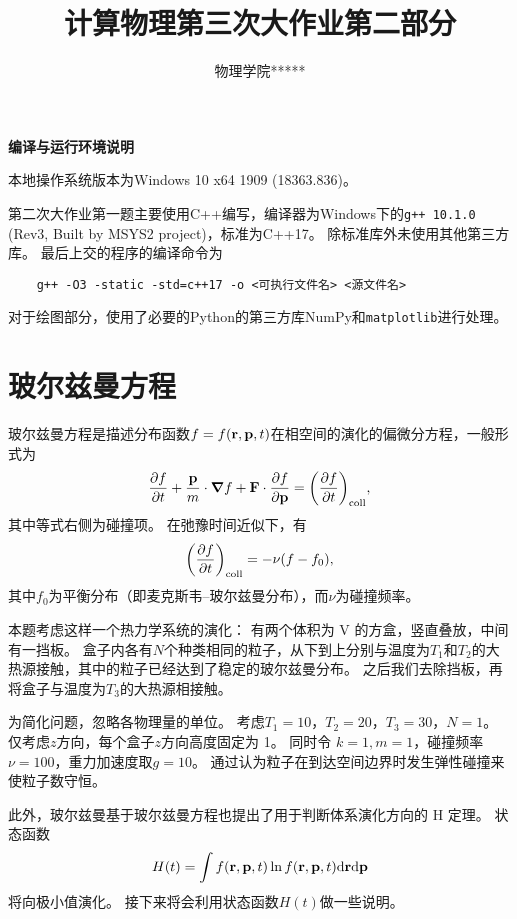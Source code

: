 \documentclass[a4paper,unicode]{report}
\title{计算物理第三次大作业第二部分}
\author{物理学院\quad ***\quad 1800011***}
\begin{document}
\maketitle
\tableofcontents

\begin{center}
    \textbf{编译与运行环境说明}
\end{center}

本地操作系统版本为\textsf{Windows 10 x64 1909 (18363.836)}。

第二次大作业第一题主要使用\textsf{C++}编写，编译器为Windows下的\texttt{g++ 10.1.0} (Rev3, Built by MSYS2 project)，标准为\textsf{C++17}。
除标准库外未使用其他第三方库。
最后上交的程序的编译命令为\begin{verbatim}
    g++ -O3 -static -std=c++17 -o <可执行文件名> <源文件名>
\end{verbatim}

对于绘图部分，使用了必要的\textsf{Python}的第三方库\textsf{NumPy}和\texttt{matplotlib}进行处理。

\setcounter{chapter}{1}
\chapter{玻尔兹曼方程}
玻尔兹曼方程是描述分布函数$ f = f(\vb{r},\vb{p},t)$在相空间的演化的偏微分方程，一般形式为
\begin{equation}\label{eq:boltzmann}
    \pdv{f}{t} + \frac{\vb{p}}{m}\cdot\grad f + \vb{F}\cdot\pdv{f}{\vb{p}} = \qty(\pdv{f}{t})_\text{coll},
\end{equation}
其中等式右侧为碰撞项。
在弛豫时间近似下，有
\begin{equation}
    \qty(\pdv{f}{t})_\text{coll} = -\nu (f -f_0),
\end{equation}
其中$f_0$为平衡分布（即麦克斯韦--玻尔兹曼分布），而$\nu$为碰撞频率。

本题考虑这样一个热力学系统的演化：
有两个体积为 V 的方盒，竖直叠放，中间有一挡板。
盒子内各有$N$个种类相同的粒子，从下到上分别与温度为$T_1$和$T_2$的大热源接触，其中的粒子已经达到了稳定的玻尔兹曼分布。
之后我们去除挡板，再将盒子与温度为$T_3$的大热源相接触。

为简化问题，忽略各物理量的单位。
考虑$T_1 = 10$，$T_2 = 20$，$T_3 = 30$，$N = 1$。
仅考虑$z$方向，每个盒子$z$方向高度固定为 1。
同时令 $k = 1, m = 1$，碰撞频率$\nu = 100$，重力加速度取$g = 10$。
通过认为粒子在到达空间边界时发生弹性碰撞来使粒子数守恒。

此外，玻尔兹曼基于玻尔兹曼方程也提出了用于判断体系演化方向的 H 定理。
状态函数
\begin{equation}
    H(t) = \int f(\vb{r},\vb{p},t)\ln f(\vb{r},\vb{p},t)\dd\vb{r}\dd\vb{p}
\end{equation}
将向极小值演化。
接下来将会利用状态函数$H(t)$做一些说明。
\end{document}
